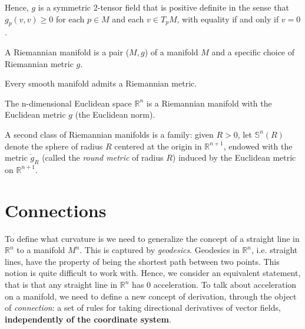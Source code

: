 \documentclass[a4paper,12pt,reqno]{amsbook}
\theoremstyle{definition} %
\newcommand{\1}{\mathbbm{1}}
\DeclareMathOperator{\vol}{vol}
\def\vol{\mathop{\mathrm{vol}}\nolimits}
\theoremstyle{plain}
\theoremstyle{remark}
\begin{document}
Hence, $g$ is a symmetric 2-tensor field that is positive definite in the sense that
$g_p(v,v) \ge 0$ for each $p \in M$ and each $v \in T_pM$, with equality if and only if $v = 0$.



\begin{definition}
    A Riemannian manifold is a pair ($M,g$) of a manifold $M$ and a specific choice of Riemannian metric $g$. 
\end{definition}

\begin{proposition}
    Every smooth manifold admits a Riemannian metric.
\end{proposition}

\begin{example}
    The n-dimensional Euclidean space $\mathbb{R}^n$ is a Riemannian manifold with the Euclidean metric $g$ (the Euclidean norm).
\end{example}

\begin{example}
    A second class of Riemannian manifolds is a family: given $R>0$, let $\mathbb{S}^n (R)$ denote the sphere of radius $R$
centered at the origin in $\mathbb{R}^{n+1}$, endowed with the metric $\mathring{g}_R$ (called the \emph{round metric}
of radius $R$) induced by the Euclidean metric on $\mathbb{R}^{n+1}$.
\end{example}


\section{Connections}
To define what curvature is we need to generalize the concept of a straight line in $\mathbb{R}^n$ to a manifold $M^n$. This is captured by \emph{geodesics}. Geodesics in $\mathbb{R}^n$, i.e. straight lines, have the property of being the shortest path between two points. This notion is quite difficult to work with. Hence, we consider an equivalent statement, that is that any straight line in $\mathbb{R}^n$ has 0 acceleration. To talk about acceleration on a manifold,  we need to define a new concept of derivation, through the object of \emph{connection}: a set of rules for taking
directional derivatives of vector fields, \textbf{independently of the coordinate system}.
\\
\end{document}
